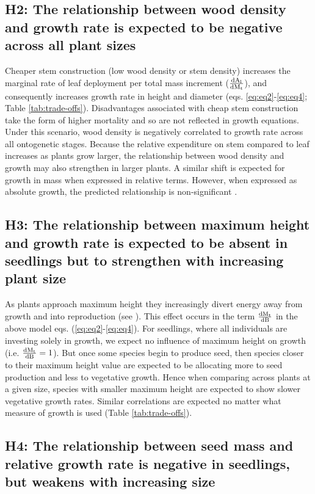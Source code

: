 \documentclass[a4paper,11pt]{article}
\begin{document}
\subsection*{H2: The relationship between wood density and growth rate is expected to be negative across all plant sizes}

Cheaper stem construction (low wood density or stem density) increases the marginal rate of leaf deployment per total mass increment ($\frac{\rm{d} A_{\rm l}}{\rm{d} M_{\rm t}}$), and consequently increases growth rate in height and diameter (eqs. \ref{eq:eq2}-\ref{eq:eq4}; Table \ref{tab:trade-offs}). Disadvantages associated with cheap stem construction take the form of higher mortality and so are not reflected in growth equations. Under this scenario, wood density is negatively correlated to growth rate across all ontogenetic stages. Because the relative expenditure on stem compared to leaf increases as plants grow larger, the relationship between wood density and growth may also strengthen in larger plants. A similar shift is expected for growth in mass when expressed in relative terms. However, when expressed as absolute growth, the predicted relationship is non-significant \citep[see also][]{Enquist-1999}.

\subsection*{H3: The relationship between maximum height and growth rate is expected to be absent in seedlings but to strengthen with increasing plant size}

As plants approach maximum height they increasingly divert energy away from growth and into reproduction (see \citealt{Thomas:1996do,Thomas-2011, Wenk:2015jz}). This effect occurs in the term $\frac{\rm{d} M_{\rm t}}{\rm{d} B}$ in the above model eqs. (\ref{eq:eq2}-\ref{eq:eq4}). For seedlings, where all individuals are investing solely in growth, we expect no influence of maximum height on growth (i.e. $\frac{\rm{d} M_{\rm t}}{\rm{d} B} =1$). But once some species begin to produce seed, then species closer to their maximum height value are expected to be allocating more to seed production and less to vegetative growth. Hence when comparing across plants at a given size, species with smaller maximum height are expected to show slower vegetative growth rates. Similar correlations are expected no matter what measure of  growth is used (Table \ref{tab:trade-offs}).

\subsection*{H4: The relationship between seed mass and relative growth rate is negative in seedlings, but weakens with increasing size}
\end{document}
